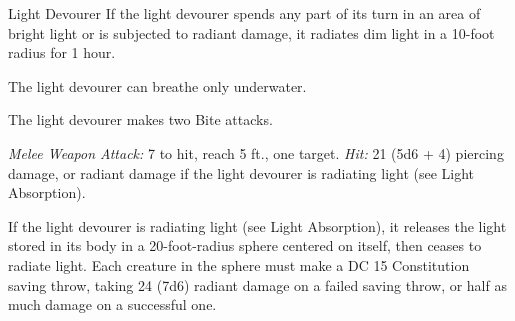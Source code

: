 \documentclass[10pt,a4paper,twoside,bg=print,twocolumn,openany,nodeprecatedcode]{dndbook}
\begin{document}
\begin{DndMonster}[float=t]{Light Devourer}
\DndMonsterBasics[
armor-class = {14},
hit-points = {\DndDice{14d8 + 56}},
speed = {0 ft., swim 30 ft.}
]
\DndMonsterAbilityScores[
 str = 18,
 dex = 18,
 con = 18,
 int = 2,
 wis = 10,
 cha = 3
]
\DndMonsterDetails[
skills = {Perception +3, Stealth +10},
damage-immunities = {radiant},
senses = {darkvision 120 ft., passive perception 13},
challenge = 6,
]
If the light devourer spends any part of its turn in an area of bright light or is subjected to radiant damage, it radiates dim light in a 10-foot radius for 1 hour.

The light devourer can breathe only underwater.

The light devourer makes two Bite attacks.

\textsl{Melee Weapon Attack:} 7 to hit, reach 5 ft., one target. \textsl{Hit:} 21 (5d6 + 4) piercing damage, or radiant damage if the light devourer is radiating light (see Light Absorption).

If the light devourer is radiating light (see Light Absorption), it releases the light stored in its body in a 20-foot-radius sphere centered on itself, then ceases to radiate light. Each creature in the sphere must make a DC 15 Constitution saving throw, taking 24 (7d6) radiant damage on a failed saving throw, or half as much damage on a successful one.

\end{DndMonster}
\end{document}
